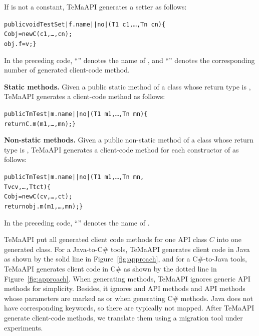 If  is not a constant, TeMaAPI generates a setter as follows:
\begin{CodeOut}%
\begin{alltt}
 public void TestSet|f.name||no|(T1\ c1,\ldots, Tn\ cn)\{
   C obj = new C(c1,\ldots, cn);
   obj.f = v; \}
\end{alltt}
\end{CodeOut}

In the preceding code, ``'' denotes the name of , and ``'' denotes the corresponding number of generated client-code method.

\textbf{Static methods.} Given a public static method  of a class  whose return type is , TeMaAPI generates a client-code method as follows:
\begin{CodeOut}%
\begin{alltt}
 public Tm Test|m.name||no|(T1\ m1,\ldots, Tn\ mn)\{
   return C.m(m1,\ldots, mn); \}
\end{alltt}
\end{CodeOut}

\textbf{Non-static methods.} Given a public non-static method  of a class  whose return type is , TeMaAPI generates a client-code method for each constructor  of  as follows:
\begin{CodeOut}%
\begin{alltt}
 public Tm Test|m.name||no|(T1\ m1,\ldots, Tn\ mn,
                            Tv cv, \ldots, Tt ct)\{
   C obj = new C(cv,\ldots, ct);
   return obj.m(m1,\ldots, mn); \}
\end{alltt}
\end{CodeOut}

In the preceding code, ``'' denotes the name of .

TeMaAPI put all generated client code methods for one API class $C$ into one generated class. For a Java-to-C\# tools, TeMaAPI generates client code in Java as shown by the solid line in Figure~\ref{fig:approach}, and for a C\#-to-Java tools, TeMaAPI generates client code in C\# as shown by the dotted line in Figure~\ref{fig:approach}. When generating methods, TeMaAPI ignores generic API methods for simplicity. Besides, it ignores  and  API methods and API methods whose parameters are marked as  or  when generating C\# methods. Java does not have corresponding keywords, so there are typically not mapped. After TeMaAPI generate client-code methods, we translate them using a migration tool under experiments.

